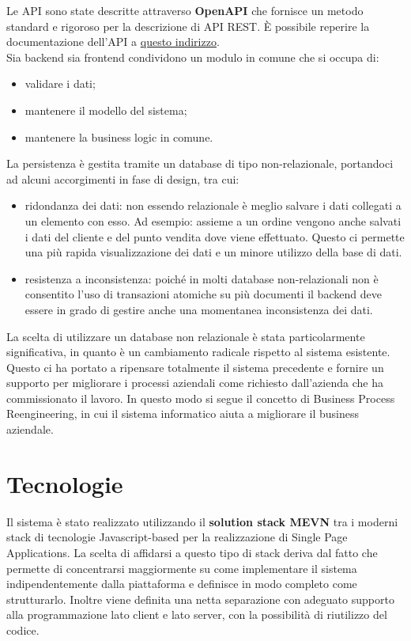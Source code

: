 \documentclass[italian]{report}
\begin{document}
Le API sono state descritte attraverso \textbf{OpenAPI} che fornisce un metodo standard e rigoroso per la descrizione di API REST.
È possibile reperire la documentazione dell'API a \href{https://app.swaggerhub.com/apis/ZACCARONIGIULIO/ColtureCloud/1.0.0}{questo indirizzo}.\\
Sia backend sia frontend condividono un modulo in comune che si occupa di:
\begin{itemize}
    \item validare i dati;
    \item mantenere il modello del sistema;
    \item mantenere la business logic in comune.
\end{itemize}
La persistenza è gestita tramite un database di tipo non-relazionale, portandoci ad alcuni accorgimenti in fase di design, tra cui:
\begin{itemize}
    \item ridondanza dei dati: non essendo relazionale è meglio salvare i dati collegati a un elemento con esso. Ad esempio: assieme a un ordine vengono anche salvati i dati del cliente e del punto vendita dove viene effettuato. Questo ci permette una più rapida visualizzazione dei dati e un minore utilizzo della base di dati.
    \item resistenza a inconsistenza: poiché in molti database non-relazionali non è consentito l'uso di transazioni atomiche su più documenti il backend deve essere in grado di gestire anche una momentanea inconsistenza dei dati.
\end{itemize}

La scelta di utilizzare un database non relazionale è stata particolarmente significativa, in quanto è un cambiamento radicale rispetto al sistema esistente. Questo ci ha portato a ripensare totalmente il sistema precedente e fornire un supporto per migliorare i processi aziendali come richiesto dall'azienda che ha commissionato il lavoro. In questo modo si segue il concetto di Business Process Reengineering, in cui il sistema informatico aiuta a migliorare il business aziendale.

\chapter{Tecnologie}

Il sistema è stato realizzato utilizzando il \textbf{solution stack MEVN} tra i moderni stack di tecnologie Javascript-based per la realizzazione di Single Page Applications. La scelta di affidarsi a questo tipo di stack deriva dal fatto che permette di concentrarsi maggiormente su come implementare il sistema indipendentemente dalla piattaforma e definisce in modo completo come strutturarlo. Inoltre viene definita una netta separazione con adeguato supporto alla programmazione lato client e lato server, con la possibilità di riutilizzo del codice.
\end{document}
